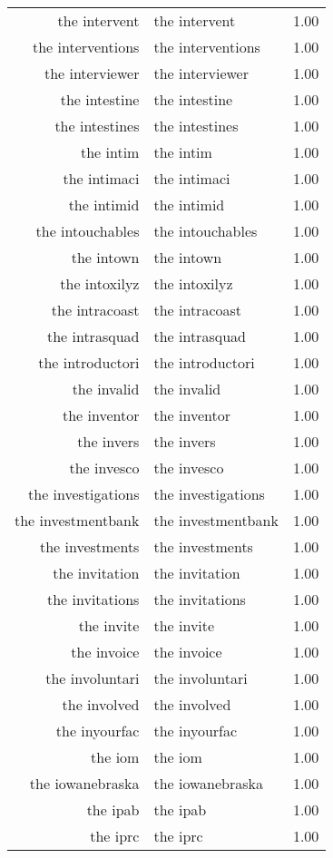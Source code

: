 \begin{table}[ht]
\begin{tabular}{rlr}
  the intervent & the intervent & 1.00 \\ 
  the interventions & the interventions & 1.00 \\ 
  the interviewer & the interviewer & 1.00 \\ 
  the intestine & the intestine & 1.00 \\ 
  the intestines & the intestines & 1.00 \\ 
  the intim & the intim & 1.00 \\ 
  the intimaci & the intimaci & 1.00 \\ 
  the intimid & the intimid & 1.00 \\ 
  the intouchables & the intouchables & 1.00 \\ 
  the intown & the intown & 1.00 \\ 
  the intoxilyz & the intoxilyz & 1.00 \\ 
  the intracoast & the intracoast & 1.00 \\ 
  the intrasquad & the intrasquad & 1.00 \\ 
  the introductori & the introductori & 1.00 \\ 
  the invalid & the invalid & 1.00 \\ 
  the inventor & the inventor & 1.00 \\ 
  the invers & the invers & 1.00 \\ 
  the invesco & the invesco & 1.00 \\ 
  the investigations & the investigations & 1.00 \\ 
  the investmentbank & the investmentbank & 1.00 \\ 
  the investments & the investments & 1.00 \\ 
  the invitation & the invitation & 1.00 \\ 
  the invitations & the invitations & 1.00 \\ 
  the invite & the invite & 1.00 \\ 
  the invoice & the invoice & 1.00 \\ 
  the involuntari & the involuntari & 1.00 \\ 
  the involved & the involved & 1.00 \\ 
  the inyourfac & the inyourfac & 1.00 \\ 
  the iom & the iom & 1.00 \\ 
  the iowanebraska & the iowanebraska & 1.00 \\ 
  the ipab & the ipab & 1.00 \\ 
  the iprc & the iprc & 1.00 \\ 

\end{tabular}
\end{table}
